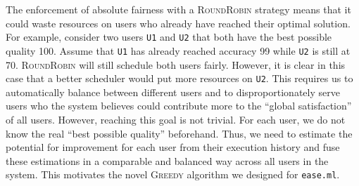 \documentclass[letterpaper]{vldb}
\newcommand{\eml}{\texttt{ease.ml}\xspace}
\newcommand{\rr}{\textsc{RoundRobin}\xspace}
\newcommand{\greedy}{\textsc{Greedy}\xspace}
\begin{document}
The enforcement of absolute fairness
with a \rr strategy means that it could
waste resources on users who already have
reached their optimal solution. For example,
consider two users \texttt{U1}
and \texttt{U2} that both have the best
possible quality 100. Assume that \texttt{U1}
has already reached accuracy 99 while 
\texttt{U2} is still at 70. \rr
will still schedule both users
fairly. However, it is clear in this case
that a better scheduler would put more
resources on \texttt{U2}. This requires
us to automatically balance between
different users and to disproportionately 
serve users who the system believes
could contribute more to the ``global satisfaction''
of all users. However, reaching this
goal is not trivial. For each user,
we do not know the real ``best possible
quality'' beforehand. Thus, we need
to estimate the potential for 
improvement for each user from their
execution history and fuse these
estimations in a comparable and balanced
way across all users in the system.
This motivates
the novel \greedy algorithm we designed for \eml.
\end{document}
